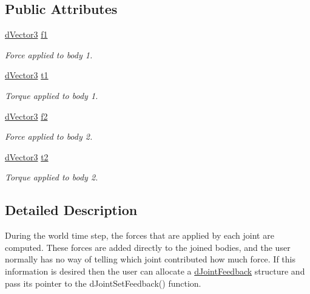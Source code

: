 \subsection*{Public Attributes}
\begin{DoxyCompactItemize}
\item 
\hyperlink{struct_tao_1_1_ode_1_1_ode_1_1d_vector3}{dVector3} \hyperlink{struct_tao_1_1_ode_1_1_ode_1_1d_joint_feedback_a1fc32210a58b84d0c68517f9c0e9eee6}{f1}
\begin{DoxyCompactList}\small\item\em Force applied to body 1. \item\end{DoxyCompactList}\item 
\hyperlink{struct_tao_1_1_ode_1_1_ode_1_1d_vector3}{dVector3} \hyperlink{struct_tao_1_1_ode_1_1_ode_1_1d_joint_feedback_a236449e03d589b755fcdda3226ae4be4}{t1}
\begin{DoxyCompactList}\small\item\em Torque applied to body 1. \item\end{DoxyCompactList}\item 
\hyperlink{struct_tao_1_1_ode_1_1_ode_1_1d_vector3}{dVector3} \hyperlink{struct_tao_1_1_ode_1_1_ode_1_1d_joint_feedback_a829e9eda7ba3d160157ff263cb93ae99}{f2}
\begin{DoxyCompactList}\small\item\em Force applied to body 2. \item\end{DoxyCompactList}\item 
\hyperlink{struct_tao_1_1_ode_1_1_ode_1_1d_vector3}{dVector3} \hyperlink{struct_tao_1_1_ode_1_1_ode_1_1d_joint_feedback_a95e30994f5104b0ab440305e91db0b96}{t2}
\begin{DoxyCompactList}\small\item\em Torque applied to body 2. \item\end{DoxyCompactList}\end{DoxyCompactItemize}


\subsection{Detailed Description}
During the world time step, the forces that are applied by each joint are computed. These forces are added directly to the joined bodies, and the user normally has no way of telling which joint contributed how much force. If this information is desired then the user can allocate a \hyperlink{struct_tao_1_1_ode_1_1_ode_1_1d_joint_feedback}{dJointFeedback} structure and pass its pointer to the dJointSetFeedback() function.

